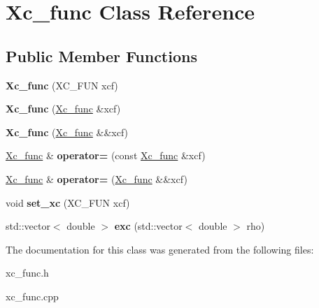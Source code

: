 \hypertarget{classXc__func}{}\section{Xc\+\_\+func Class Reference}
\label{classXc__func}
\subsection*{Public Member Functions}
\begin{DoxyCompactItemize}
\item 
\mbox{\label{classXc__func_af1ca3a813970389dffaf293c621f4dd1}} 
{\bfseries Xc\+\_\+func} (X\+C\+\_\+\+F\+UN xcf)
\item 
\mbox{\label{classXc__func_a5d652acc1dd46b751d95ac50d60997bf}} 
{\bfseries Xc\+\_\+func} (\hyperlink{classXc__func}{Xc\+\_\+func} \&xcf)
\item 
\mbox{\label{classXc__func_ad4e97d8fe55a2f04c11bf77e436e5148}} 
{\bfseries Xc\+\_\+func} (\hyperlink{classXc__func}{Xc\+\_\+func} \&\&xcf)
\item 
\mbox{\label{classXc__func_a61241dfe6ec9d5dec7da446cecbda0ac}} 
\hyperlink{classXc__func}{Xc\+\_\+func} \& {\bfseries operator=} (const \hyperlink{classXc__func}{Xc\+\_\+func} \&xcf)
\item 
\mbox{\label{classXc__func_aab12b0db236a3ea0f12ba2e7387cd6d7}} 
\hyperlink{classXc__func}{Xc\+\_\+func} \& {\bfseries operator=} (\hyperlink{classXc__func}{Xc\+\_\+func} \&\&xcf)
\item 
\mbox{\label{classXc__func_a211595e6d679b872cf319c0e71b9c660}} 
void {\bfseries set\+\_\+xc} (X\+C\+\_\+\+F\+UN xcf)
\item 
\mbox{\label{classXc__func_acda87fdd7d2aa1758f5ac7179e3ddf97}} 
std\+::vector$<$ double $>$ {\bfseries exc} (std\+::vector$<$ double $>$ rho)
\end{DoxyCompactItemize}


The documentation for this class was generated from the following files\+:\begin{DoxyCompactItemize}
\item 
xc\+\_\+func.\+h\item 
xc\+\_\+func.\+cpp\end{DoxyCompactItemize}
